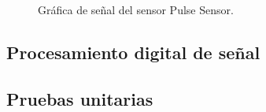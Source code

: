 	\begin{figure}[htbp!]
		\centering
		\caption{Gráfica de señal del sensor Pulse Sensor.}
		\label{fig:GraficaPulseSensor}
	\end{figure}
	
\subsection{Procesamiento digital de señal}

\subsection{Pruebas unitarias}